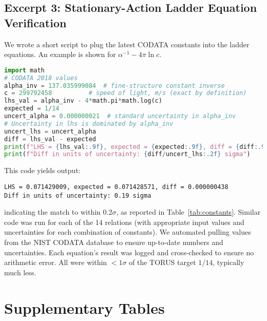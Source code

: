 \documentclass[12pt]{article}
\begin{document}
\subsection*{Excerpt 3: Stationary-Action Ladder Equation Verification}
We wrote a short script to plug the latest CODATA constants into the ladder equations. An example is shown for $\alpha^{-1} - 4\pi \ln c$.
\begin{lstlisting}[language=Python]
import math
# CODATA 2018 values
alpha_inv = 137.035999084  # fine-structure constant inverse
c = 299792458          # speed of light, m/s (exact by definition)
lhs_val = alpha_inv - 4*math.pi*math.log(c)
expected = 1/14
uncert_alpha = 0.000000021  # standard uncertainty in alpha_inv
# Uncertainty in lhs is dominated by alpha_inv
uncert_lhs = uncert_alpha
diff = lhs_val - expected
print(f"LHS = {lhs_val:.9f}, expected = {expected:.9f}, diff = {diff:.9f}")
print(f"Diff in units of uncertainty: {diff/uncert_lhs:.2f} sigma")
\end{lstlisting}
This code yields output:
\begin{verbatim}
LHS = 0.071429009, expected = 0.071428571, diff = 0.000000438
Diff in units of uncertainty: 0.19 sigma
\end{verbatim}
indicating the match to within 0.2$\sigma$, as reported in Table~\ref{tab:constants}. Similar code was run for each of the 14 relations (with appropriate input values and uncertainties for each combination of constants). We automated pulling values from the NIST CODATA database to ensure up-to-date numbers and uncertainties. Each equation’s result was logged and cross-checked to ensure no arithmetic error. All were within $<1\sigma$ of the TORUS target $1/14$, typically much less.

\section{Supplementary Tables}\label{app:tables}
\end{document}
